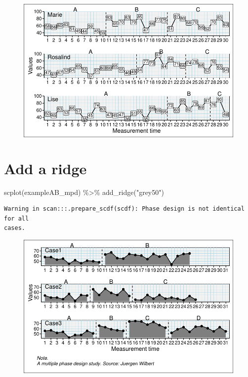\documentclass[
  letterpaper,
  DIV=11,
  numbers=noendperiod]{scrreprt}
\newenvironment{Shaded}{\begin{snugshade}}{\end{snugshade}}
\newcommand{\FunctionTok}[1]{\textcolor[rgb]{0.28,0.35,0.67}{#1}}
\newcommand{\NormalTok}[1]{\textcolor[rgb]{0.00,0.23,0.31}{#1}}
\newcommand{\SpecialCharTok}[1]{\textcolor[rgb]{0.37,0.37,0.37}{#1}}
\newcommand{\StringTok}[1]{\textcolor[rgb]{0.13,0.47,0.30}{#1}}
\begin{document}
\begin{figure}[H]

{\centering \includegraphics{./ch_scplot_files/figure-pdf/valuelabels2-1.pdf}

}

\end{figure}

\hypertarget{add-a-ridge}{%
\section{Add a ridge}\label{add-a-ridge}}

\begin{Shaded}
\begin{Highlighting}[]
\FunctionTok{scplot}\NormalTok{(exampleAB\_mpd) }\SpecialCharTok{\%\textgreater{}\%} 
  \FunctionTok{add\_ridge}\NormalTok{(}\StringTok{"grey50"}\NormalTok{)}
\end{Highlighting}
\end{Shaded}

\begin{verbatim}
Warning in scan:::.prepare_scdf(scdf): Phase design is not identical for all
cases.
\end{verbatim}

\begin{figure}[H]

{\centering \includegraphics{./ch_scplot_files/figure-pdf/ridge1-1.pdf}

}

\end{figure}
\end{document}
